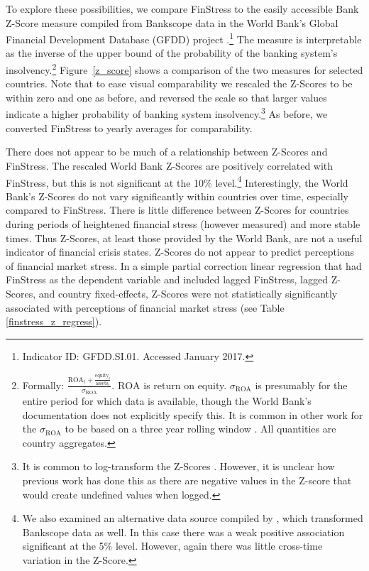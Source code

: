 \documentclass[]{article}
\begin{document}
To explore these possibilities, we compare FinStress to the easily accessible Bank Z-Score measure compiled from Bankscope data in the World Bank's Global Financial Development Database (GFDD) project \citep{worldbank2013}.\footnote{Indicator ID: GFDD.SI.01. Accessed January 2017.} The measure is interpretable as the inverse of the upper bound of the probability of the banking system's insolvency.\footnote{Formally: $\frac{\mathrm{ROA}_{t} + \frac{\mathrm{equity}_{t}}{\mathrm{assets}_{t}}}{\sigma_{\mathrm{ROA}}}$. $\mathrm{ROA}$ is return on equity. $\sigma_{\mathrm{ROA}}$ is presumably for the entire period for which data is available, though the World Bank's documentation does not explicitly specify this. It is common in other work for the $\sigma_{\mathrm{ROA}}$ to be based on a three year rolling window \cite[225]{beck2013bank}. All quantities are country aggregates.} Figure~\ref{z_score} shows a comparison of the two measures for selected countries. Note that to ease visual comparability we rescaled the Z-Scores to be within zero and one as before, and reversed the scale so that larger values indicate a higher probability of banking system insolvency.\footnote{It is common to log-transform the Z-Scores \cite[225]{beck2013bank}. However, it is unclear how previous work has done this as there are negative values in the Z-score that would create undefined values when logged.} As before, we converted FinStress to yearly averages for comparability.

There does not appear to be much of a relationship between Z-Scores and FinStress. The rescaled World Bank Z-Scores are positively correlated with FinStress, but this is not significant at the 10\% level.\footnote{We also examined an alternative data source compiled by \cite{Andrianova2015}, which transformed Bankscope data as well. In this case there was a weak positive association significant at the 5\% level. However, again there was little cross-time variation in the Z-Score.} Interestingly, the World Bank's Z-Scores do not vary significantly within countries over time, especially compared to  FinStress. There is little difference between Z-Scores for countries during periods of heightened financial stress (however measured) and more stable times. Thus Z-Scores, at least those provided by the World Bank, are not a useful indicator of financial crisis states. Z-Scores do not appear to predict perceptions of financial market stress. In a simple partial correction linear regression that had FinStress as the dependent variable and included lagged FinStress, lagged Z-Scores, and country fixed-effects, Z-Scores were not statistically significantly associated with perceptions of financial market stress (see Table \ref{finstress_z_regress}).
\end{document}
